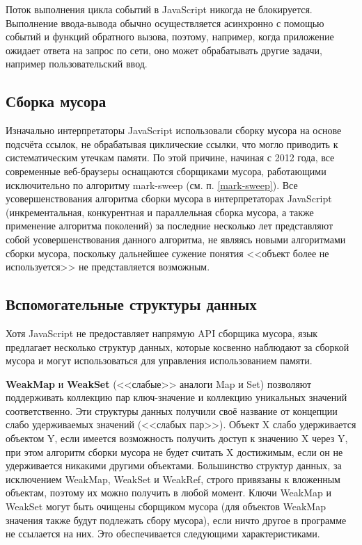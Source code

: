 Поток выполнения цикла событий в JavaScript никогда не блокируется. Выполнение ввода-вывода обычно осуществляется асинхронно с помощью событий и функций обратного вызова, поэтому, например, когда приложение ожидает ответа на запрос по сети, оно может обрабатывать другие задачи, например пользовательский ввод. \cite{js_event_loop}



\subsection{Сборка мусора}

Изначально интерпретаторы JavaScript использовали сборку мусора на основе подсчёта ссылок, не обрабатывая циклические ссылки, что могло приводить к систематическим утечкам памяти. По этой причине, начиная с 2012 года, все современные веб-браузеры оснащаются сборщиками мусора, работающими исключительно по алгоритму mark-sweep (см. п. \ref{mark-sweep}). Все усовершенствования алгоритма сборки мусора в интерпретаторах JavaScript (инкрементальная, конкурентная и параллельная сборка мусора, а также применение алгоритма поколений) за последние несколько лет представляют собой усовершенствования данного алгоритма, не являясь новыми алгоритмами сборки мусора, поскольку дальнейшее сужение понятия <<объект более не используется>> не представляется возможным. \cite{js_memory}



\clearpage
\subsection{Вспомогательные структуры данных}

Хотя JavaScript не предоставляет напрямую API сборщика мусора, язык предлагает несколько структур данных, которые косвенно наблюдают за сборкой мусора и могут использоваться для управления использованием памяти.~\cite{js_memory}

\textbf{WeakMap} и \textbf{WeakSet} (<<слабые>> аналоги Map и Set) позволяют поддерживать коллекцию пар ключ-значение и коллекцию уникальных значений соответственно. Эти структуры данных получили своё название от концепции слабо удерживаемых значений (<<слабых пар>>). Объект X слабо удерживается объектом Y, если имеется возможность получить доступ к значению X через Y, при этом алгоритм сборки мусора не будет считать X достижимым, если он не удерживается никакими другими объектами. Большинство структур данных, за исключением WeakMap, WeakSet и WeakRef, строго привязаны к вложенным объектам, поэтому их можно получить в любой момент. Ключи WeakMap и WeakSet могут быть очищены сборщиком мусора (для объектов WeakMap значения также будут подлежать сбору мусора), если ничто другое в программе не ссылается на них. Это обеспечивается следующими характеристиками. \cite{js_memory}

